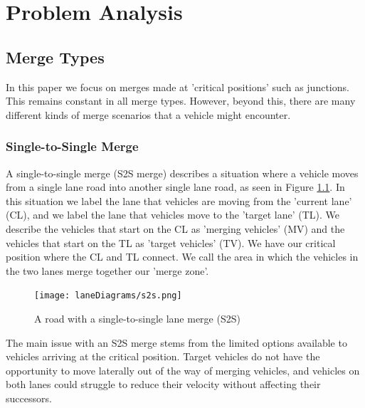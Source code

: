 \chapter{Problem Analysis}
\label{cha:Problem Analysis}

\section{Merge Types}
\label{sec:Merge Types}
In this paper we focus on merges made at 'critical positions' such as junctions. This remains constant in all merge types. However, beyond this, there are many different kinds of merge scenarios that a vehicle might encounter.

\subsection{Single-to-Single Merge}
\label{subsec:Single-to-Single Merge}
A single-to-single merge (S2S merge) describes a situation where a vehicle moves from a single lane road into another single lane road, as seen in Figure \ref{fig:S2SMerge}. In this situation we label the lane that vehicles are moving from the 'current lane' (CL), and we label the lane that vehicles move to the 'target lane' (TL). We describe the vehicles that start on the CL as 'merging vehicles' (MV) and the vehicles that start on the TL as 'target vehicles' (TV). We have our critical position where the CL and TL connect. We call the area in which the vehicles in the two lanes merge together our 'merge zone'.

\begin{figure}[htb]
\texttt{[image: laneDiagrams/s2s.png]}
\caption{A road with a single-to-single lane merge (S2S)}
\label{fig:S2SMerge}
\end{figure}

The main issue with an S2S merge stems from the limited options available to vehicles arriving at the critical position. Target vehicles do not have the opportunity to move laterally out of the way of merging vehicles, and vehicles on both lanes could struggle to reduce their velocity without affecting their successors.

